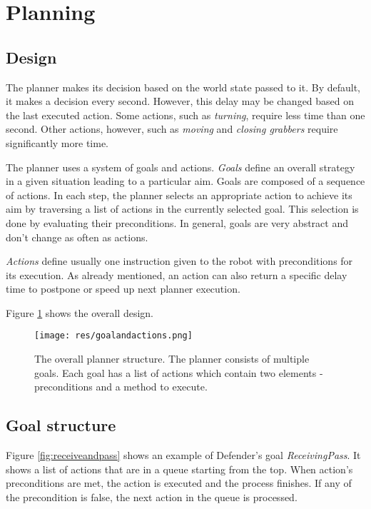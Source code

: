 \section{Planning}

\subsection{Design}

The planner makes its decision based on the world state passed to it. By default, it makes a decision every second. However, this delay may be changed based on the last executed action. Some actions, such as \emph{turning}, require less time than one second. Other actions, however, such as \emph{moving} and \emph{closing grabbers} require significantly more time.


The planner uses a system of goals and actions. \emph{Goals} define an overall strategy in a given situation leading to a particular aim. Goals are composed of a sequence of actions. In each step, the planner selects an appropriate action to achieve its aim by traversing a list of actions in the currently selected goal. This selection is done by evaluating their preconditions. In general, goals are very abstract and don't change as often as actions.

\emph{Actions} define usually one instruction given to the robot with preconditions for its execution. As already mentioned, an action can also return a specific delay time to postpone or speed up next planner execution.

Figure \ref{fig:goalsandactionsstructure} shows the overall design.

\begin{figure}[H]
	\begin{center}
    \texttt{[image: res/goalandactions.png]}
    \caption{The overall planner structure. The planner consists of multiple goals. Each goal has a list of actions which contain two elements - preconditions and a method to execute.}
    \label{fig:goalsandactionsstructure}
	\end{center}
\end{figure}


\subsection{Goal structure}


Figure \ref{fig:receiveandpass} shows an example of Defender's goal
\emph{ReceivingPass}. It shows a list of actions that are in a queue starting
from the top. When action's preconditions are met, the action is executed and
the process finishes. If any of the precondition is false, the next action in
the queue is processed.

